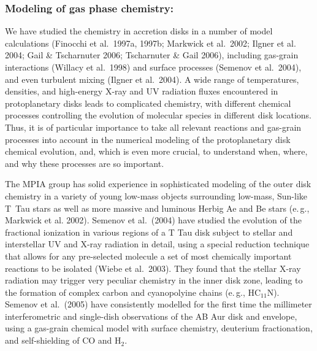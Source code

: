 \subsubsection{Modeling of gas phase chemistry:} We have studied the
chemistry in accretion disks in a number of model calculations
(Finocchi et al.~1997a, 1997b; Markwick et al.~2002; Ilgner et al.
2004; Gail \& Tscharnuter 2006; Tscharnuter \& Gail 2006),
including gas-grain interactions (Willacy et al.~1998) and surface
processes (Semenov et al.~2004), and even turbulent mixing (Ilgner
et al.~2004). A wide range of temperatures, densities, and
high-energy X-ray and UV radiation fluxes encountered in
protoplanetary disks leads to complicated chemistry, with
different chemical processes controlling the evolution of
molecular species in different disk locations. Thus, it is of
particular importance to take all relevant reactions and gas-grain
processes into account in the numerical modeling of the
protoplanetary disk chemical evolution, and, which is even more
crucial, to understand when, where, and why these processes are so
important.

The MPIA group has solid experience in sophisticated modeling of
the outer disk chemistry in a variety of young low-mass objects
surrounding low-mass, Sun-like T~Tau stars as well as more massive
and luminous Herbig Ae and Be stars (e.\,g., Markwick et al.
2002). Semenov et al.~(2004) have studied the evolution of the
fractional ionization in various regions of a T Tau disk subject
to stellar and interstellar UV and X-ray radiation in detail,
using a special reduction technique that allows for any
pre-selected molecule a set of most chemically important reactions
to be isolated (Wiebe et al.~2003). They found that the stellar
X-ray radiation may trigger very peculiar chemistry in the inner
disk zone, leading to the formation of complex carbon and
cyanopolyine chains (e.\,g., HC$_{11}$N). Semenov et al.~(2005)
have consistently modelled for the first time the millimeter
interferometric and single-dish observations of the AB Aur disk
and envelope, using a gas-grain chemical model with surface
chemistry, deuterium fractionation, and self-shielding of CO and
H$_2$.

